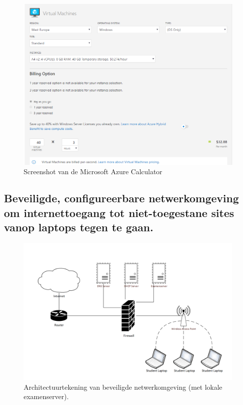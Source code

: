 	
	\begin{figure}
	\includegraphics[width=\linewidth]{img/AzCalc.PNG}
	\caption[Screenshot van de Microsoft Azure Calculator]{Screenshot van de Microsoft Azure Calculator}
	\label{fig:Calculator1}
\end{figure}

	
	
\newpage

\subsection{Beveiligde, configureerbare netwerkomgeving om internettoegang tot niet-toegestane sites vanop laptops tegen te gaan.	}

	\begin{figure}
	\includegraphics[width=\linewidth]{img/OpstellingNWOMG}
	\caption{Architectuurtekening van beveiligde netwerkomgeving (met lokale examenserver).}
	\label{fig:Omgeving1}
\end{figure}

